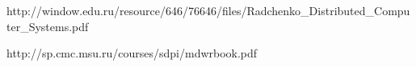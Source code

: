 http://window.edu.ru/resource/646/76646/files/Radchenko_Distributed_Computer_Systems.pdf

http://sp.cmc.msu.ru/courses/sdpi/mdwrbook.pdf
